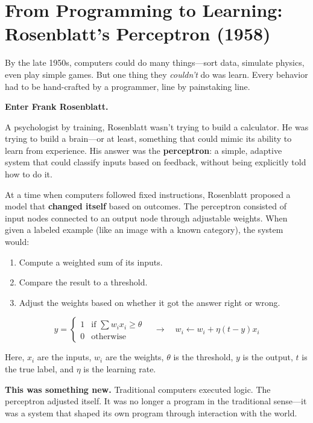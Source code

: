 \section{From Programming to Learning: Rosenblatt’s Perceptron (1958)}

By the late 1950s, computers could do many things—sort data, simulate physics, even play simple games. But one thing they \emph{couldn’t} do was learn. Every behavior had to be hand-crafted by a programmer, line by painstaking line.

\medskip

\textbf{Enter Frank Rosenblatt.}

A psychologist by training, Rosenblatt wasn’t trying to build a calculator. He was trying to build a brain—or at least, something that could mimic its ability to learn from experience. His answer was the \textbf{perceptron}: a simple, adaptive system that could classify inputs based on feedback, without being explicitly told how to do it.

\medskip

At a time when computers followed fixed instructions, Rosenblatt proposed a model that \textbf{changed itself} based on outcomes. The perceptron consisted of input nodes connected to an output node through adjustable weights. When given a labeled example (like an image with a known category), the system would:

\begin{enumerate}
  \item Compute a weighted sum of its inputs.
  \item Compare the result to a threshold.
  \item Adjust the weights based on whether it got the answer right or wrong.
\end{enumerate}

\[
y = 
\begin{cases}
1 & \text{if } \sum w_i x_i \geq \theta \\
0 & \text{otherwise}
\end{cases}
\quad \longrightarrow \quad
w_i \gets w_i + \eta (t - y) x_i
\]

Here, \( x_i \) are the inputs, \( w_i \) are the weights, \( \theta \) is the threshold, \( y \) is the output, \( t \) is the true label, and \( \eta \) is the learning rate.

\medskip

\textbf{This was something new.}  
Traditional computers executed logic. The perceptron adjusted itself. It was no longer a program in the traditional sense—it was a system that shaped its own program through interaction with the world.


